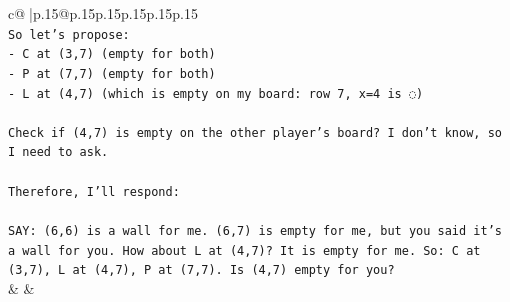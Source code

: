 \documentclass{article}
\begin{document}
{\begin{supertabular}{c@{$\;$}|p{.15\linewidth}@{}p{.15\linewidth}p{.15\linewidth}p{.15\linewidth}p{.15\linewidth}p{.15\linewidth}}
{{{\\ 
\texttt{So let's propose:} \\
\texttt{{-} C at (3,7) (empty for both)} \\
\texttt{{-} P at (7,7) (empty for both)} \\
\texttt{{-} L at (4,7) (which is empty on my board: row 7, x=4 is ◌)} \\
\\ 
\texttt{Check if (4,7) is empty on the other player's board? I don't know, so I need to ask.} \\
\\ 
\texttt{Therefore, I'll respond:} \\
\\ 
\texttt{SAY: (6,6) is a wall for me. (6,7) is empty for me, but you said it's a wall for you. How about L at (4,7)? It is empty for me. So: C at (3,7), L at (4,7), P at (7,7). Is (4,7) empty for you?} \\
            }
        }
    }
    & & \\ \\


\end{supertabular}}
\end{document}
